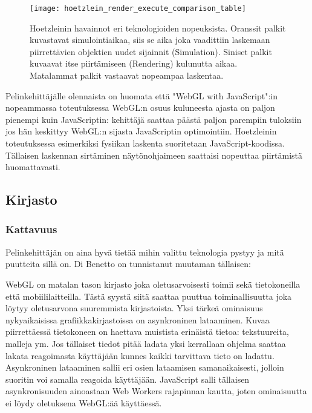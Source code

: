 \begin{figure}[h]
    \texttt{[image: hoetzlein\_render\_execute\_comparison\_table]}
    \caption{\label{fig:hoetzlein_comparison}Hoetzleinin\cite{hoetzlein} havainnot eri teknologioiden nopeuksista. Oranssit palkit kuvastavat simulointiaikaa, siis se aika joka vaadittiin laskemaan piirrettävien objektien uudet sijainnit (Simulation). Siniset palkit kuvaavat itse piirtämiseen (Rendering) kulunutta aikaa. Matalammat palkit vastaavat nopeampaa laskentaa.}
\end{figure}

Pelinkehittäjälle olennaista on huomata että "WebGL with JavaScript":in nopeammassa toteutuksessa WebGL:n osuus kuluneesta ajasta on paljon pienempi kuin JavaScriptin: kehittäjä saattaa päästä paljon parempiin tuloksiin jos hän keskittyy WebGL:n sijasta JavaScriptin optimointiin. Hoetzleinin\cite{hoetzlein} toteutuksessa esimerkiksi fysiikan laskenta suoritetaan JavaScript-koodissa. Tällaisen laskennan sirtäminen näytönohjaimeen saattaisi nopeuttaa piirtämistä huomattavasti. 

\subsection{Kirjasto}

\subsubsection{Kattavuus}
\label{subsec:kattavuus}

Pelinkehittäjän on aina hyvä tietää mihin valittu teknologia pystyy ja mitä puutteita sillä on. Di Benetto\cite{dibenedettoSpider} on tunnistanut muutaman tällaisen:

WebGL on matalan tason kirjasto joka oletusarvoisesti toimii sekä tietokoneilla että mobiililaitteilla. Tästä syystä siitä saattaa puuttua toiminallisuutta joka löytyy oletusarvona suuremmista kirjastoista.
Yksi tärkeä ominaisuus nykyaikaisissa grafiikkakirjastoissa on asynkroninen lataaminen. Kuvaa piirrettäessä tietokoneen on haettava muistista erinäistä tietoa: tekstuureita, malleja ym. Jos tällaiset tiedot pitää ladata yksi kerrallaan ohjelma saattaa lakata reagoimasta käyttäjään kunnes kaikki tarvittava tieto on ladattu. Asynkroninen lataaminen sallii eri osien lataamisen samanaikaisesti, jolloin suoritin voi samalla reagoida käyttäjään. JavaScript salli tällaisen asynkronisuuden ainoastaan Web Workers rajapinnan kautta\cite{htmlwebworkers}, joten ominaisuutta ei löydy oletuksena WebGL:ää käyttäessä.

